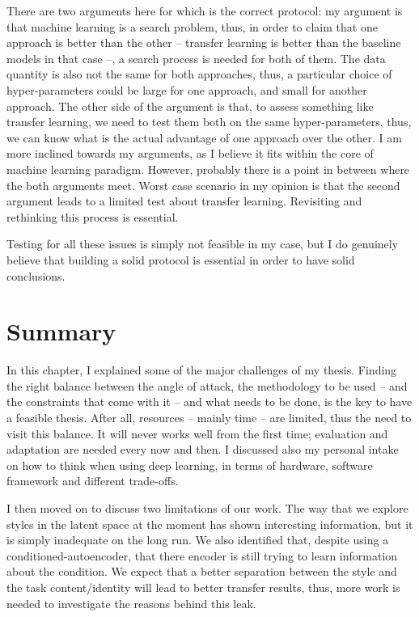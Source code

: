 \begin{itemize}
      There are two arguments here for which is the correct protocol: my argument is that machine learning is a search problem, thus, in order to claim that one approach is better than the other -- transfer learning is better than the baseline models in that case --, a search process is needed for both of them. The data quantity is also not the same for both approaches, thus, a particular choice of hyper-parameters could be large for one approach, and small for another approach. The other side of the argument is that, to assess something like transfer learning, we need to test them both on the same hyper-parameters, thus, we can know what is the actual advantage of one approach over the other. I am more inclined towards my arguments, as I believe it fits within the core of machine learning paradigm. However, probably there is a point in between where the both arguments meet. Worst case scenario in my opinion is that the second argument leads to a limited test about transfer learning. Revisiting and rethinking this process is essential.
    \end{itemize}
    \par Testing for all these issues is simply not feasible in my case, but I do genuinely believe that building a solid protocol is essential in order to have solid conclusions.


  \section{Summary}
  \par In this chapter, I explained some of the major challenges of my thesis. Finding the right balance between the angle of attack, the methodology to be used -- and the constraints that come with it -- and what needs to be done, is the key to have a feasible thesis. After all, resources -- mainly time -- are limited, thus the need to visit this balance. It will never works well from the first time; evaluation and adaptation are needed every now and then. I discussed also my personal intake on how to think when using deep learning, in terms of hardware, software framework and different trade-offs.

  \par I then moved on to discuss two limitations of our work. The way that we explore styles in the latent space at the moment has shown interesting information, but it is simply inadequate on the long run. We also identified that, despite using a conditioned-autoencoder, that there encoder is still trying to learn information about the condition. We expect that a better separation between the style and the task content/identity will lead to better transfer results, thus, more work is needed to investigate the reasons behind this leak.

